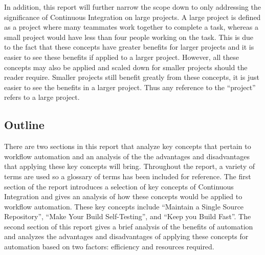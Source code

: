 In addition, this report will further narrow the scope down to only addressing the significance of Continuous Integration on large projects. A large project is defined as a project where many teammates work together to complete a task, whereas a small project would have less than four people working on the task.  This is due to the fact that these concepts have greater benefits for larger projects and it is easier to see these benefits if applied to a larger project. However, all these concepts may also be applied and scaled down for smaller projects should the reader require.  Smaller projects still benefit greatly from these concepts, it is just easier to see the benefits in a larger project.  Thus any reference to the ``project'' refers to a large project.

	\subsection{Outline} %
	\label{sub:outline}
There are two sections in this report that analyze key concepts that pertain to workflow automation and an analysis of the the advantages and disadvantages that applying these key concepts will bring. Throughout the report, a variety of terms are used so a glossary of terms has been included for reference. The first section of the report introduces a selection of key concepts of Continuous Integration and gives an analysis of how these concepts would be applied to workflow automation.  These key concepts include ``Maintain a Single Source Repository'', ``Make Your Build Self-Testing'', and ``Keep you Build Fast''.  The second section of this report gives a brief analysis of the benefits of automation and analyzes the advantages and disadvantages of applying these concepts for automation based on two factors: efficiency and resources required.

